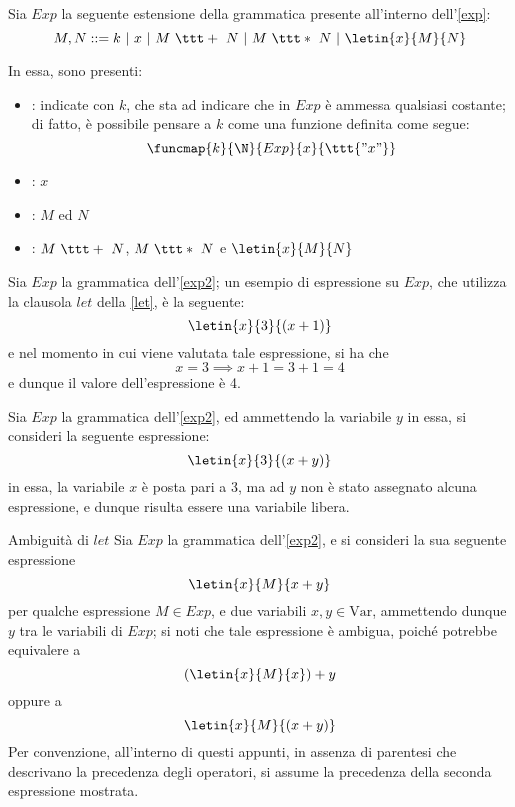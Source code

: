 \documentclass[a4paper, 12pt]{report}
\begin{document}
    \begin{example}
        \label{exp2}
        Sia $Exp$ la seguente estensione della grammatica presente all'interno dell'\cref{exp}: $$M, N ::= k \ | \ x \ | \ M \ \ttt + \ N \ | \ M \ \ttt * \ N \ | \ \letin{x}{M}{N}$$

        In essa, sono presenti:

        \begin{itemize}
            \item {}: indicate con $k$, che sta ad indicare che in $Exp$ è ammessa qualsiasi costante; di fatto, è possibile pensare a $k$ come una funzione definita come segue: $$\funcmap{k}{\N}{Exp}{x}{\ttt{"x"}}$$
            \item {}: $x$
            \item {}: $M$ ed $N$
            \item {}: $M \ \ttt + \ N$, $M \ \ttt * \ N$ e $\letin{x}{M}{N}$
        \end{itemize}
    \end{example}

    \begin{example}
        Sia $Exp$ la grammatica dell'\cref{exp2}; un esempio di espressione su $Exp$, che utilizza la clausola $let$ della \cref{let}, è la seguente: $$\letin{x}{3}{(x + 1)}$$ e nel momento in cui viene valutata tale espressione, si ha che $$x = 3 \implies x + 1 = 3 + 1 = 4$$ e dunque il valore dell'espressione è 4.
    \end{example}

    \begin{example}
        Sia $Exp$ la grammatica dell'\cref{exp2}, ed ammettendo la variabile $y$ in essa, si consideri la seguente espressione: $$\letin{x}{3}{(x + y)}$$ in essa, la variabile $x$ è posta pari a 3, ma ad $y$ non è stato assegnato alcuna espressione, e dunque risulta essere una variabile libera.
    \end{example}

    \begin{framedobs}{Ambiguità di $let$}
        Sia $Exp$ la grammatica dell'\cref{exp2}, e si consideri la sua seguente espressione $$\letin{x}{M}{x + y}$$ per qualche espressione $M \in Exp$, e due variabili $x, y \in \mathrm{Var}$, ammettendo dunque $y$ tra le variabili di $Exp$; si noti che tale espressione è ambigua, poiché potrebbe equivalere a $$(\letin{x}{M}{x}) + y$$ oppure a $$\letin{x}{M}{(x + y)}$$ Per convenzione, all'interno di questi appunti, in assenza di parentesi che descrivano la precedenza degli operatori, si assume la precedenza della seconda espressione mostrata.
    \end{framedobs}
\end{document}
